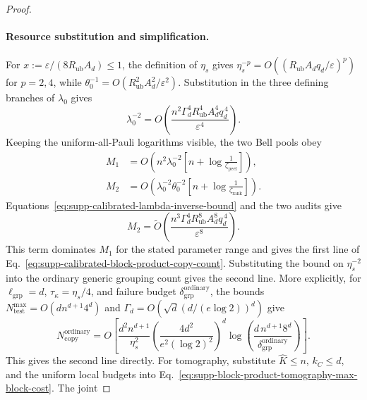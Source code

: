 \documentclass[
  aps,
  prx,
  reprint,
  superscriptaddress,
  amsmath,
  amssymb,
  nofootinbib,
  longbibliography
]{revtex4-2}
\begin{document}
\begin{proof}
\paragraph{Resource substitution and simplification.}
For
\(x:=\varepsilon/(8R_{\mathrm{ub}}A_d)\le1\), the definition of
\(\eta_s\) gives
\(\eta_s^{-p}=O((R_{\mathrm{ub}}A_dq_d/\varepsilon)^p)\)
for \(p=2,4\), while
\(\theta_0^{-1}=O(R_{\mathrm{ub}}^2A_d^2/\varepsilon^2)\).
Substitution in the three defining branches of $\lambda_0$ gives
\begin{equation}
\lambda_0^{-2}
=
O\!\left(
\frac{
n^2\Gamma_d^4R_{\mathrm{ub}}^4A_d^4
q_d^{\,4}
}{\varepsilon^4}
\right).
\label{eq:supp-calibrated-lambda-inverse-bound}
\end{equation}
Keeping the uniform-all-Pauli logarithms visible, the two Bell pools obey
\begin{align}
M_1
&=
O\!\left(
n^2\lambda_0^{-2}
\left[n+\log\frac1{\zeta_{\mathrm{peel}}}\right]
\right),
\label{eq:supp-calibrated-first-bell-audit}\\
M_2
&=
O\!\left(
\lambda_0^{-2}\theta_0^{-2}
\left[n+\log\frac1{\zeta_{\mathrm{rank}}}\right]
\right).
\label{eq:supp-calibrated-second-bell-audit}
\end{align}
Equations~\eqref{eq:supp-calibrated-lambda-inverse-bound} and the two audits
give
\begin{equation}
M_2
=
\widetilde O\!\left(
\frac{
n^3\Gamma_d^4R_{\mathrm{ub}}^8A_d^8
q_d^{\,4}
}{\varepsilon^8}
\right).
\end{equation}
This term dominates $M_1$ for the stated parameter range and gives the first
line of
Eq.~\eqref{eq:supp-calibrated-block-product-copy-count}.  Substituting the bound on
\(\eta_s^{-2}\) into the ordinary generic grouping count gives the second
line.  More explicitly, for $\ell_{\mathrm{grp}}=d$,
$\tau_\kappa=\eta_s/4$, and failure budget
$\delta_{\mathrm{grp}}^{\mathrm{ordinary}}$, the bounds
$N_{\mathrm{test}}^{\max}=O(dn^{d+1}4^d)$ and
$\Gamma_d=O(\sqrt d(d/(e\log2))^d)$ give
\begin{equation}
N_{\mathrm{copy}}^{\mathrm{ordinary}}
=O\!\left[
\frac{d^2n^{d+1}}{\eta_s^2}
\left(\frac{4d^2}{e^2(\log2)^2}\right)^d
\log\!\left(
\frac{d\,n^{d+1}8^d}{\delta_{\mathrm{grp}}^{\mathrm{ordinary}}}
\right)
\right].
\label{eq:supp-copy-count-emp-cumulant-asymptotic}
\end{equation}
This gives the second line directly.  For tomography, substitute
$\widehat K\le n$, $k_C\le d$, and the
uniform local budgets into
Eq.~\eqref{eq:supp-block-product-tomography-max-block-cost}.  The joint

\end{proof}
\end{document}
